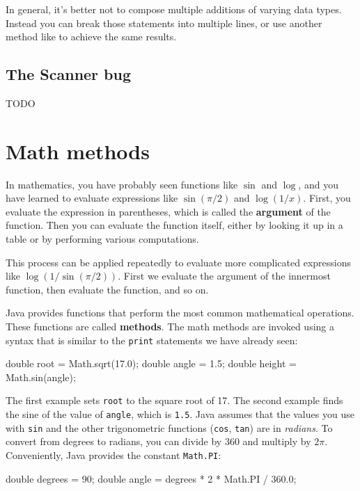 In general, it's better not to compose multiple additions of varying data types.
Instead you can break those statements into multiple lines, or use another method like  to achieve the same results.

\subsection{The Scanner bug}

TODO


\section{Math methods}


In mathematics, you have probably seen functions like $\sin$ and $\log$, and you have learned to evaluate expressions like $\sin(\pi/2)$ and $\log(1/x)$.
First, you evaluate the expression in parentheses, which is called the {\bf argument} of the function.
Then you can evaluate the function itself, either by looking it up in a table or by performing various computations.

This process can be applied repeatedly to evaluate more complicated expressions like $\log(1/\sin(\pi/2))$.
First we evaluate the argument of the innermost function, then evaluate the function, and so on.

Java provides functions that perform the most common mathematical operations.
These functions are called {\bf methods}.
The math methods are invoked using a syntax that is similar to the {\tt print} statements we have already seen:

\begin{code}
    double root = Math.sqrt(17.0);
    double angle = 1.5;
    double height = Math.sin(angle);
\end{code}

The first example sets {\tt root} to the square root of 17.
The second example finds the sine of the value of {\tt angle}, which is {\tt 1.5}.
Java assumes that the values you use with {\tt sin} and the other trigonometric functions ({\tt cos}, {\tt tan}) are in {\em radians}.
To convert from degrees to radians, you can divide by 360 and multiply by $2 \pi$.
Conveniently, Java provides the constant {\tt Math.PI}:

\begin{code}
    double degrees = 90;
    double angle = degrees * 2 * Math.PI / 360.0;
\end{code}

